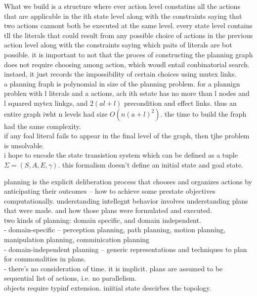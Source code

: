 \documentclass[
a4paper, %
11pt, %
onecolumn, %
openany, %
]{memoir}
\begin{document}
What we build is a structure where ever action level constatins all the actions that are applicable in the ith state level along with the constraints saying that two actions cannont both be executed at the same level. every state level contains tll the literals that could result from any possible choice of actions in the previous action level along with the constraints saying which paits of literals are bot possible. it is important to not that the proces of constructing the planning graph does not require choosing among action, which woudl entail conbinatorial search. instaed, it just records the impossibility of certain choices using mutex links.\\

a planning fraph is polynomial in size of the planning problem. for a plannign problen with l literals and a actions, ach ith sstate has no more than l nodes and l squared mytex linkgs, and $2(al+l)$ precondition and effect links. thus an entire graph iwht n levels had size $O(n(a+l)^2)$. the time to build the fraph had the same complexity.\\

if any foal literal fails to appear in the final level of the graph, then tjhe problem is unsolvable. \\

i hope to encode the state transistion system which can be defined as a tuple $\Sigma = (S,A,E,\gamma)$. this formalism doesn't define an initial state and goal state.

planning is the explicit deliberation process that chooses and organizes actions by anticipating their outcomes -- how to achieve some prestate objectives computationally. understanding intellegnt behavior involves understanding plans that were made. and how those plans were formulated and executed. \\

two kinds of planning: domain specific, and domain independent.\\
- domain-specific -- perception planning, path planning, motion planning, manipulation planning, comminication planning\\
- domain-independent planning -- generic representations and techniques to plan for commonalities in plans. \\
- there's no consideration of time. it is implicit. plans are assumed to be sequential list of actions, i.e. no parallelism.\\

objects require typinf extension. iniitial state descirbes the topology.\\
\end{document}
